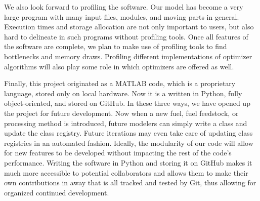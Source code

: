\documentclass{article}
\begin{document}
We also look forward to profiling the software. Our model has become a very large program with many input files, modules, and moving parts in general. Execution times and storage allocation are not only important to users, but also hard to delineate in such programs without profiling tools. Once all features of the software are complete, we plan to make use of profiling tools to find bottlenecks and memory draws. Profiling different implementations of optimizer algorithms will also play some role in which optimizers are offered as well.\par

Finally, this project originated as a MATLAB code, which is a proprietary language, stored only on local hardware. Now it is a written in Python, fully object-oriented, and stored on GitHub. In these three ways, we have opened up the project for future development. Now when a new fuel, fuel feedstock, or processing method is introduced, future modelers can simply write a class and update the class registry. Future iterations may even take care of updating class registries in an automated fashion. Ideally, the modularity of our code will allow for new features to be developed without impacting the rest of the code's performance. Writing the software in Python and storing it on GitHub makes it much more accessible to potential collaborators and allows them to make their own contributions in away that is all tracked and tested by Git, thus allowing for organized continued development.\par



\end{document}
